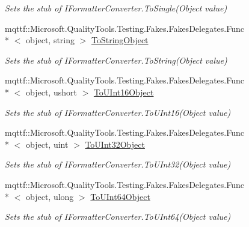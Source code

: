 \begin{DoxyCompactItemize}
\begin{DoxyCompactList}\small\item\em Sets the stub of I\-Formatter\-Converter.\-To\-Single(\-Object value)\end{DoxyCompactList}\item 
mqttf\-::\-Microsoft.\-Quality\-Tools.\-Testing.\-Fakes.\-Fakes\-Delegates.\-Func\\*
$<$ object, string $>$ \hyperlink{class_system_1_1_runtime_1_1_serialization_1_1_fakes_1_1_stub_i_formatter_converter_a85bf7abd70c85db8570a838e69902bb5}{To\-String\-Object}
\begin{DoxyCompactList}\small\item\em Sets the stub of I\-Formatter\-Converter.\-To\-String(\-Object value)\end{DoxyCompactList}\item 
mqttf\-::\-Microsoft.\-Quality\-Tools.\-Testing.\-Fakes.\-Fakes\-Delegates.\-Func\\*
$<$ object, ushort $>$ \hyperlink{class_system_1_1_runtime_1_1_serialization_1_1_fakes_1_1_stub_i_formatter_converter_a2c77ff194bd33699e51330b41dd48764}{To\-U\-Int16\-Object}
\begin{DoxyCompactList}\small\item\em Sets the stub of I\-Formatter\-Converter.\-To\-U\-Int16(\-Object value)\end{DoxyCompactList}\item 
mqttf\-::\-Microsoft.\-Quality\-Tools.\-Testing.\-Fakes.\-Fakes\-Delegates.\-Func\\*
$<$ object, uint $>$ \hyperlink{class_system_1_1_runtime_1_1_serialization_1_1_fakes_1_1_stub_i_formatter_converter_a862b0e6a894ec37501e6e0def5b2529c}{To\-U\-Int32\-Object}
\begin{DoxyCompactList}\small\item\em Sets the stub of I\-Formatter\-Converter.\-To\-U\-Int32(\-Object value)\end{DoxyCompactList}\item 
mqttf\-::\-Microsoft.\-Quality\-Tools.\-Testing.\-Fakes.\-Fakes\-Delegates.\-Func\\*
$<$ object, ulong $>$ \hyperlink{class_system_1_1_runtime_1_1_serialization_1_1_fakes_1_1_stub_i_formatter_converter_a19bcf13606d8e53159e826c8cb2dba10}{To\-U\-Int64\-Object}
\begin{DoxyCompactList}\small\item\em Sets the stub of I\-Formatter\-Converter.\-To\-U\-Int64(\-Object value)\end{DoxyCompactList}\end{DoxyCompactItemize}


